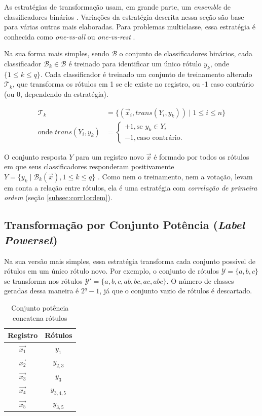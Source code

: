 \documentclass[runningheads,a4paper]{llncs}
\begin{document}
As estratégias de transformação usam, em grande parte, um \textit{ensemble} de classificadores binários \cite{Zhang2014-be}. Variações da estratégia descrita nessa seção são base para várias outras mais elaboradas. Para problemas multiclasse, essa estratégia é conhecida como \textit{one-vs-all} ou \textit{one-vs-rest} \cite{Bishop2006-vm}.

Na sua forma mais simples, sendo $\mathcal{B}$ o conjunto de classificadores binários, cada classificador $\mathcal{B}_k \in \mathcal{B}$ é treinado para identificar um único rótulo $y_k$, onde $\{1 \leq k \leq q \}$. Cada classificador é treinado um conjunto de treinamento alterado $\mathcal{T}_k$, que transforma os rótulos em 1 se ele existe no registro, ou -1 caso contrário (ou 0, dependendo da estratégia).

\begin{align*}
\mathcal{T}_k& = \{ (\vec{x}_i, trans(Y_i, y_k)) \mid 1 \leq i \leq n \} \\
\text{onde } trans(Y_i, y_k) &= \begin{cases}
				 				  +1, \text{se $y_k \in Y_i$}\\
								  -1, \text{caso contrário.}
			  				    \end{cases}
\end{align*}

O conjunto resposta $Y$ para um registro novo $\vec{x}$ é formado por todos os rótulos em que seus classificadores responderam positivamente $Y = \{ y_k \mid \mathcal{B}_k(\vec{x}), 1 \leq k \leq q \}$ . Como nem o treinamento, nem a votação, levam em conta a relação entre rótulos, ela é uma estratégia com \textit{correlação de primeira ordem} (seção \ref{subsec:corr1ordem}).

\subsection{Transformação por Conjunto Potência (\textit{Label Powerset})} \label{subsec:conjuntopotencia}

Na sua versão mais simples, essa estratégia transforma cada conjunto possível de rótulos em um único rótulo novo. Por exemplo, o conjunto de rótulos $\mathcal{Y} = \{a, b, c\}$ se transforma nos rótulos $\mathcal{Y'} = \{a, b, c, ab, bc, ac, abc\}$. O número de classes geradas dessa maneira é $2^q-1$, já que o conjunto vazio de rótulos é descartado.

\begin{table}
	\centering
	\begin{tabular}{| c | c |}
		\hline
		\textbf{Registro} & \textbf{Rótulos} \\
		\hline
		$\vec{x_1}$ & $y_1$ \\
		\hline
		$\vec{x_2}$ & $y_{2, 3}$ \\
		\hline
		$\vec{x_3}$ & $y_3$ \\
		\hline
		$\vec{x_4}$ & $y_{3, 4, 5}$ \\
		\hline
		$\vec{x_5}$ & $y_{3, 5}$ \\
		\hline
	\end{tabular}
	\caption{Conjunto potência concatena rótulos}
	\label{tab:expotencia}
\end{table}
\end{document}
